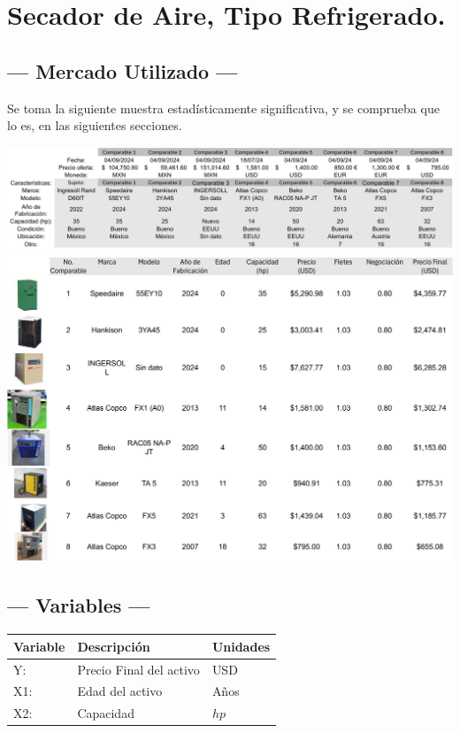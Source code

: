 
\section{Secador de Aire, Tipo Refrigerado.} %

\subsection{\centering --- Mercado Utilizado ---} %
Se toma la siguiente muestra estadísticamente significativa, y se 
comprueba que lo es, en las siguientes secciones.
\begin{center}
\includegraphics[width=  0.9 \linewidth, page = 1]{../0.imagenes/CAP_8/mercado_5_1}
\includegraphics[width=  0.9\linewidth, page = 1]{../0.imagenes/CAP_8/mercado_5_2}
\end{center}

\subsection{\centering --- Variables ---} %
\begin{center}
  \begin{tabular}{|l|l|l|}
    \hline 
    Variable & Descripción   & Unidades\\ \hline 
    Y:  & Precio Final del activo  & USD \\ \hline 
    X1: & Edad del activo    & Años \\ \hline 
		X2: & Capacidad & \(hp\) \\ \hline 
  \end{tabular}
\end{center} 

